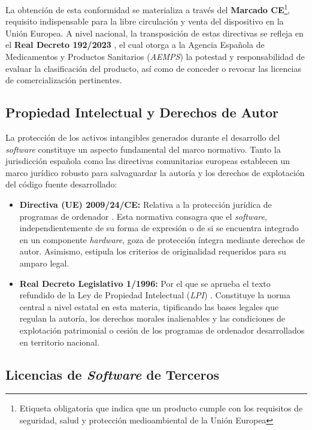 La obtención de esta conformidad se materializa a través del \textbf{Marcado CE}\footnote{Etiqueta obligatoria que indica que un producto cumple con los requisitos de seguridad, salud y protección medioambiental de la Unión Europea}, requisito indispensable para la libre circulación y venta del dispositivo en la Unión Europea. A nivel nacional, la transposición de estas directivas se refleja en el \textbf{Real Decreto 192/2023} \cite{boe2023/192}, el cual otorga a la Agencia Española de Medicamentos y Productos Sanitarios (\textit{AEMPS}) la potestad y responsabilidad de evaluar la clasificación del producto, así como de conceder o revocar las licencias de comercialización pertinentes.

\subsection{Propiedad Intelectual y Derechos de Autor}

La protección de los activos intangibles generados durante el desarrollo del \textit{software} constituye un aspecto fundamental del marco normativo. Tanto la jurisdicción española como las directivas comunitarias europeas establecen un marco jurídico robusto para salvaguardar la autoría y los derechos de explotación del código fuente desarrollado:

\begin{itemize}
    \item \textbf{Directiva (UE) 2009/24/CE:} Relativa a la protección jurídica de programas de ordenador \cite{boe2009/24/CE}. Esta normativa consagra que el \textit{software}, independientemente de su forma de expresión o de si se encuentra integrado en un componente \textit{hardware}, goza de protección íntegra mediante derechos de autor. Asimismo, estipula los criterios de originalidad requeridos para su amparo legal.
    \item \textbf{Real Decreto Legislativo 1/1996:} Por el que se aprueba el texto refundido de la Ley de Propiedad Intelectual (\textit{LPI}) \cite{boe1/1996}. Constituye la norma central a nivel estatal en esta materia, tipificando las bases legales que regulan la autoría, los derechos morales inalienables y las condiciones de explotación patrimonial o cesión de los programas de ordenador desarrollados en territorio nacional.
\end{itemize}

\subsection{Licencias de \textit{Software} de Terceros}

